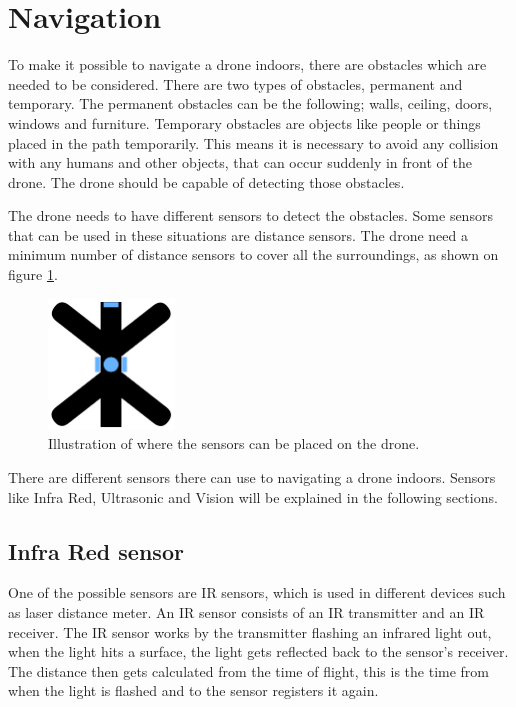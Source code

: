 \section{Navigation} \label{s:navi}
To make it possible to navigate a drone indoors, there are obstacles which are needed to be considered. There are two types of obstacles, permanent and temporary. The permanent obstacles can be the following; walls, ceiling, doors, windows and furniture. Temporary obstacles are objects like people or things placed in the path temporarily. This means it is necessary to avoid any collision with any humans and other objects, that can occur suddenly in front of the drone. The drone should be capable of detecting those obstacles. 
\newline

The drone needs to have different sensors to detect the obstacles. Some sensors that can be used in these situations are distance sensors. The drone need a minimum number of distance sensors to cover all the surroundings, as shown on figure \ref{fig:drone_sensor}.
\begin{figure}[H]
    \centering
    \includegraphics[width=0.3\textwidth]{figures/Navigation/DroneIR.png}
    \caption{Illustration of where the sensors can be placed on the drone.}
    \label{fig:drone_sensor}
\end{figure}
There are different sensors there can use to navigating a drone indoors. Sensors like Infra Red, Ultrasonic and Vision will be explained in the following sections.

\subsection*{Infra Red sensor}
One of the possible sensors are IR sensors, which is used in different devices such as laser distance meter. An IR sensor consists of an IR transmitter and an IR receiver. 
The IR sensor works by the transmitter flashing an infrared light out, when the light hits a surface, the light gets reflected back to the sensor's receiver. The distance then gets calculated from the time of flight, this is the time from when the light is flashed and to the sensor registers it again.


